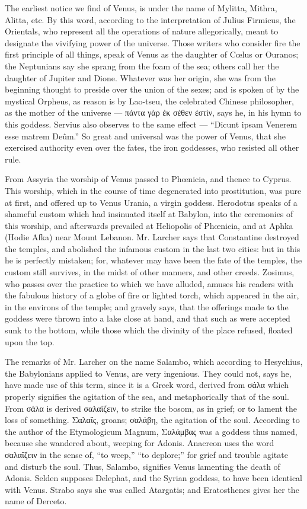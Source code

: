 \documentclass[a4paper, 11pt, oneside, polutonikogreek, english]{article}
\begin{document}
The earliest notice we find of Venus, is under the name of Mylitta, Mithra, Alitta, etc. By this word, according to the interpretation of Julius Firmicus, the Orientals, who represent all the operations of nature allegorically, meant to designate the vivifying power of the universe. Those writers who consider fire the first principle of all things, speak of Venus as the daughter of Cœlus or Ouranos; the Neptunians say she sprang from the foam of the sea; others call her the daughter of Jupiter and Dione. Whatever was her origin, she was from the beginning thought to preside over the union of the sexes; and is spoken of by the mystical Orpheus, as reason is by Lao-tseu, the celebrated Chinese philosopher, as the mother of the universe --- πάντα γὰρ ἐκ σέθεν ἐστὶν, says he, in his hymn to this goddess. Servius also observes to the same effect --- ``Dicunt ipsam Venerem esse matrem Deûm.'' So great and universal was the power of Venus, that she exercised authority even over the fates, the iron goddesses, who resisted all other rule.

From Assyria the worship of Venus passed to Phœnicia, and thence to Cyprus. This worship, which in the course of time degenerated into prostitution, was pure at first, and offered up to Venus Urania, a virgin goddess. Herodotus speaks of a shameful custom which had insinuated itself at Babylon, into the ceremonies of this worship, and afterwards prevailed at Heliopolis of Phœnicia, and at Aphka (Hodie Afka) near Mount Lebanon. Mr. Larcher says that Constantine destroyed the temples, and abolished the infamous custom in the last two cities: but in this he is perfectly mistaken; for, whatever may have been the fate of the temples, the custom still survives, in the midst of other manners, and other creeds. Zosimus, who passes over the practice to which we have alluded, amuses his readers with the fabulous history of a globe of fire or lighted torch, which appeared in the air, in the environs of the temple; and gravely says, that the offerings made to the goddess were thrown into a lake close at hand, and that such as were accepted sunk to the bottom, while those which the divinity of the place refused, floated upon the top.

The remarks of Mr. Larcher on the name Salambo, which according to Hesychius, the Babylonians applied to Venus, are very ingenious. They could not, says he, have made use of this term, since it is a Greek word, derived from σάλα which properly signifies the agitation of the sea, and metaphorically that of the soul. From σάλα is derived σαλαΐζειν, to strike the bosom, as in grief; or to lament the loss of something. Σαλαΐς, groans; σαλάβη, the agitation of the soul. According to the author of the Etymologicum Magnum, Σαλάμβας was a goddess thus named, because she wandered about, weeping for Adonis. Anacreon uses the word σαλαΐζειν in the sense of, ``to weep,'' ``to deplore;'' for grief and trouble agitate and disturb the soul. Thus, Salambo, signifies Venus lamenting the death of Adonis. Selden supposes Delephat, and the Syrian goddess, to have been identical with Venus. Strabo says she was called Atargatis; and Eratosthenes gives her the name of Derceto.
\end{document}
